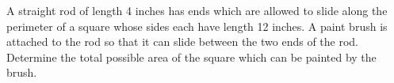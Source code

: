 A straight rod of length 4 inches has ends which are allowed to slide along the
perimeter of a square whose sides each have length 12 inches. A paint brush is
attached to the rod so that it can slide between the two ends of the rod.
Determine the total possible area of the square which can be painted by the
brush.
